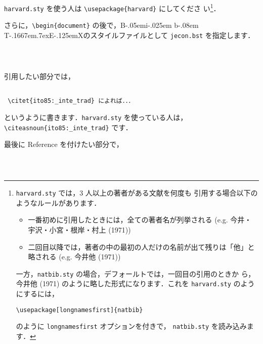 \documentclass[a4j,10pt]{jarticle}
\def\BibTeX{{\rm B\kern-.05em{\sc i\kern-.025em b}\kern-.08em
    T\kern-.1667em\lower.7ex\hbox{E}\kern-.125emX}}
\begin{document}
\texttt{harvard.sty} を使う人は \verb|\usepackage{harvard}| にしてくださ
い\footnote{\texttt{harvard.sty} では，3 人以上の著者がある文献を何度も
引用する場合以下のようなルールがあります．
\begin{itemize}
 \item 一番初めに引用したときには，全ての著者名が列挙される (e.g. 今井・
       宇沢・小宮・根岸・村上 (1971))  
 \item 二回目以降では，著者の中の最初の人だけの名前が出て残りは「他」と
       略される (e.g. 今井他 (1971))
\end{itemize}

一方，\texttt{natbib.sty} の場合，デフォールトでは，一回目の引用のときか
ら，今井他 (1971) のように略した形式になります．これを 
\texttt{harvard.sty} のようにするには，
\begin{flushleft}
\hspace*{1cm} \verb|\usepackage[longnamesfirst]{natbib}|
\end{flushleft}
のように \texttt{longnamesfirst} オプションを付きで， 
\texttt{natbib.sty} を読み込みます．}．

さらに，\verb|\begin{document}| の後で，\BibTeX のスタイルファイルとして 
\texttt{jecon.bst} を指定します．

\begin{screen}
 \begin{verbatim}

 
 \end{verbatim}
\end{screen}

引用したい部分では，

\begin{screen}
 \begin{verbatim}
        
 \citet{ito85:_inte_trad} によれば．．．
 \end{verbatim}
\end{screen}

というように書きます．\texttt{harvard.sty} を使っている人は，
\verb|\citeasnoun{ito85:_inte_trad}| です．

最後に Reference を付けたい部分で，

\begin{screen}
 \begin{verbatim}
        
 
 \end{verbatim}
\end{screen}
\end{document}
